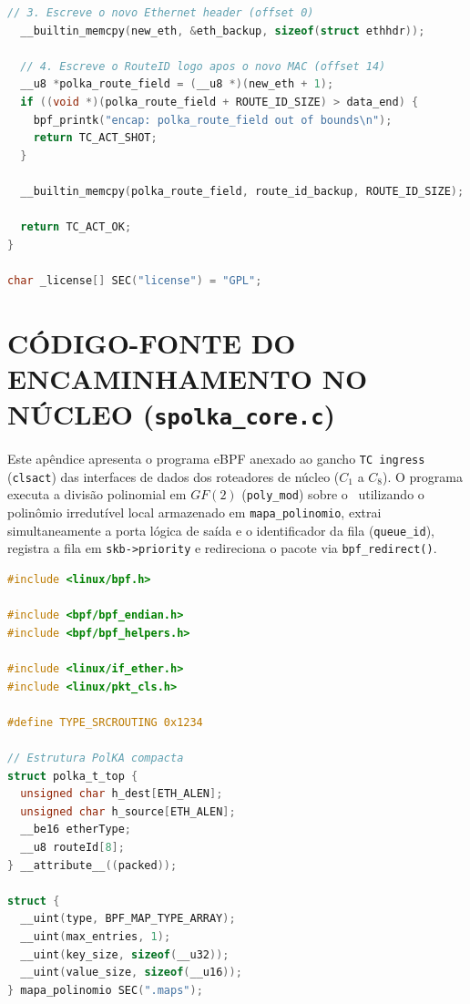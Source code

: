 \begin{apendicesenv}
\begin{lstlisting}[language=C, caption={Programa eBPF de classificação e encapsulamento na borda (\texttt{spolka\_edge\_encap.c}).}, label={lst:spolka_edge_encap}]
  // 3. Escreve o novo Ethernet header (offset 0)
  __builtin_memcpy(new_eth, &eth_backup, sizeof(struct ethhdr));

  // 4. Escreve o RouteID logo apos o novo MAC (offset 14)
  __u8 *polka_route_field = (__u8 *)(new_eth + 1);
  if ((void *)(polka_route_field + ROUTE_ID_SIZE) > data_end) {
    bpf_printk("encap: polka_route_field out of bounds\n");
    return TC_ACT_SHOT;
  }

  __builtin_memcpy(polka_route_field, route_id_backup, ROUTE_ID_SIZE);

  return TC_ACT_OK;
}

char _license[] SEC("license") = "GPL";
\end{lstlisting}

\chapter{CÓDIGO-FONTE DO ENCAMINHAMENTO NO NÚCLEO (\texttt{spolka\_core.c})}
\label{apendice:core}

Este apêndice apresenta o programa eBPF anexado ao gancho \texttt{TC ingress} (\texttt{clsact}) das interfaces de dados dos roteadores de núcleo ($C_1$ a $C_8$). O programa executa a divisão polinomial em $GF(2)$ (\texttt{poly\_mod}) sobre o \routeID\ utilizando o polinômio irredutível local armazenado em \texttt{mapa\_polinomio}, extrai simultaneamente a porta lógica de saída e o identificador da fila (\texttt{queue\_id}), registra a fila em \texttt{skb->priority} e redireciona o pacote via \texttt{bpf\_redirect()}.

\begin{lstlisting}[language=C, caption={Programa eBPF de decodificação em $GF(2)$ e encaminhamento sem estado no núcleo (\texttt{spolka\_core.c}).}, label={lst:spolka_core}]
#include <linux/bpf.h>

#include <bpf/bpf_endian.h>
#include <bpf/bpf_helpers.h>

#include <linux/if_ether.h>
#include <linux/pkt_cls.h>

#define TYPE_SRCROUTING 0x1234

// Estrutura PolKA compacta
struct polka_t_top {
  unsigned char h_dest[ETH_ALEN];
  unsigned char h_source[ETH_ALEN];
  __be16 etherType;
  __u8 routeId[8];
} __attribute__((packed));

struct {
  __uint(type, BPF_MAP_TYPE_ARRAY);
  __uint(max_entries, 1);
  __uint(key_size, sizeof(__u32));
  __uint(value_size, sizeof(__u16));
} mapa_polinomio SEC(".maps");


\end{lstlisting}
\end{apendicesenv}
